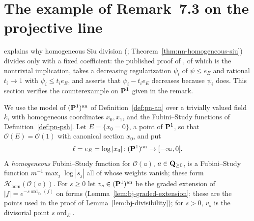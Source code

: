 \section{The example of Remark~7.3 on the projective line}\label{sec:r73-projective-line}

\cite[Remark~7.3]{FHX} explains why homogeneous Siu division (\cite[Theorem~7.2]{FHX}; Theorem~\ref{thm:nn-homogeneous-siu}) divides only with a fixed coefficient:
the published proof of \cite[Theorem~6.21]{BJ22}, of which \cite[Theorem~7.2]{FHX} is the nontrivial implication, takes a decreasing regularization $\psi_i$ of
$\psi\le e_E$ and rational $t_i\to1$ with $\psi_i\le t_ie_E$, and asserts that $\psi_i-t_ie_E$ decreases because $\psi_i$ does. This section verifies the
counterexample on $\mathbf{P}^1$ given in the remark.

We use the model of $(\mathbf{P}^1)^{\mathrm{an}}$ of Definition~\ref{def:pn-an} over a trivially valued field $k$, with homogeneous coordinates $x_0,x_1$, and the Fubini--Study
functions of Definition~\ref{def:pn-psh}. Let $E=\{x_0=0\}$, a point of $\mathbf{P}^1$, so that $\mathcal O(E)=\mathcal O(1)$ with canonical section $x_0$, and put
\[
\ell=e_E=\log|x_0|\colon(\mathbf{P}^1)^{\mathrm{an}}\to[-\infty,0].
\]
A \emph{homogeneous} Fubini--Study function for $\mathcal O(a)$, $a\in\mathbf{Q}_{\ge0}$, is a Fubini--Study function $m^{-1}\max_j\log|s_j|$ all of whose weights vanish;
these form $\mathcal H_{\mathrm{hom}}(\mathcal O(a))$. For $s\ge0$ let $v_s\in(\mathbf{P}^1)^{\mathrm{an}}$ be the graded extension of $|f|=e^{-s\operatorname{ord}_{x_0}(f)}$ on forms
(Lemma~\ref{lem:bj-graded-extension}; these are the points used in the proof of Lemma~\ref{lem:bj-divisibility}); for $s>0$, $v_s$ is the divisorial point
$s\operatorname{ord}_E$.


